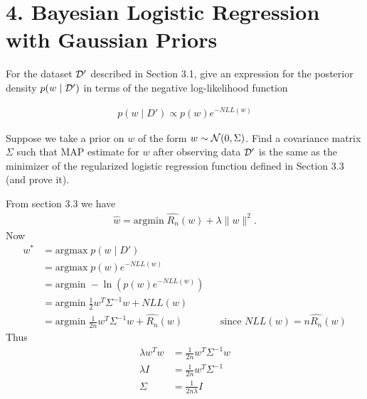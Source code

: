 \documentclass[12pt,letterpaper]{article}
\begin{document}
\section*{4. Bayesian Logistic Regression with Gaussian Priors}
\begin{problem}{4.1}
    For the dataset $\mathcal{D}'$ described in Section 3.1,
    give an expression for the posterior density $p(w\mid\mathcal{D}')$ in terms
    of the negative log-likelihood function
\end{problem}
\begin{solution}{}
    \begin{align*}
        p(w\mid D') \propto p(w)e^{-NLL(w)}
    \end{align*}
\end{solution}
\newpage

\begin{problem}{4.2}
    Suppose we take a prior on $w$ of the form $w\sim\mathcal{N}(0,\Sigma)$.
    Find a covariance matrix $\Sigma$ such that MAP estimate for $w$
    after observing data $\mathcal{D}'$ is the same as the minimizer of the regularized
    logistic regression function defined in Section 3.3
    (and prove it).
\end{problem}
\begin{solution}{}
    From section 3.3 we have
    \begin{align*}
        \hat{w} = \text{argmin}\;\hat{R_n}(w)+\lambda\|w\|^{2}.
    \end{align*}
    Now
    \begin{align*}
        w^* &= \text{argmax}\; p(w\mid D')\\
        &= \text{argmax}\; p(w)e^{-NLL(w)}\\
        &= \text{argmin}\;-\ln\left(p(w)e^{-NLL(w)}\right)\\
        &= \text{argmin}\; \frac{1}{2}w^T\Sigma^{-1}w + NLL(w)\\
        &= \text{argmin}\; \frac{1}{2n}w^T\Sigma^{-1}w + \hat{R_n}(w) && \text{since $NLL(w)=n\hat{R_n}(w)$}
    \end{align*}
    Thus
    \begin{align*}
        \lambda w^Tw &= \frac{1}{2n}w^T\Sigma^{-1}w\\
        \lambda I &= \frac{1}{2n}w^T\Sigma^{-1}\\
        \Sigma &= \frac{1}{2n\lambda}I
    \end{align*}
\end{solution}
\newpage
\end{document}
